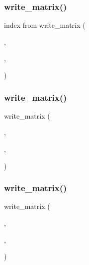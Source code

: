 \subsubsection{\texorpdfstring{write\+\_\+matrix()}{write\_matrix()}\hspace{0.1cm}{\footnotesize\ttfamily [7/15]}}
{\footnotesize\ttfamily index from write\+\_\+matrix (\begin{DoxyParamCaption}\item[{\hyperlink{a00473_ae0527cbfd56392d5095a691bbf10ba5b}{f\+ID}}]{,  }\item[{\hyperlink{a00575_a14c594ef4287da2ed00e98012e0356d9}{L\+I\+FT}}]{,  }\item[{\textquotesingle{}\hyperlink{a00575_a14c594ef4287da2ed00e98012e0356d9}{L\+I\+FT}\textquotesingle{}}]{ }\end{DoxyParamCaption})}

\mbox{\label{a00473_ae04a93a1d451776db6be5c023eea26f5}} 
\subsubsection{\texorpdfstring{write\+\_\+matrix()}{write\_matrix()}\hspace{0.1cm}{\footnotesize\ttfamily [8/15]}}
{\footnotesize\ttfamily write\+\_\+matrix (\begin{DoxyParamCaption}\item[{\hyperlink{a00473_ae0527cbfd56392d5095a691bbf10ba5b}{f\+ID}}]{,  }\item[{\hyperlink{a00473_a6d762c2c00824e501e0b1336e38cd878}{Vq}}]{,  }\item[{\textquotesingle{}\hyperlink{a00473_a6d762c2c00824e501e0b1336e38cd878}{Vq}\textquotesingle{}}]{ }\end{DoxyParamCaption})}

\mbox{\label{a00473_a533e2ddf4cca17141204e32648f7d694}} 
\subsubsection{\texorpdfstring{write\+\_\+matrix()}{write\_matrix()}\hspace{0.1cm}{\footnotesize\ttfamily [9/15]}}
{\footnotesize\ttfamily write\+\_\+matrix (\begin{DoxyParamCaption}\item[{\hyperlink{a00473_ae0527cbfd56392d5095a691bbf10ba5b}{f\+ID}}]{,  }\item[{\hyperlink{a00473_a0860e58b8f4010af9aa55717745c4b9d}{Drq}}]{,  }\item[{\textquotesingle{}\hyperlink{a00473_a0860e58b8f4010af9aa55717745c4b9d}{Drq}\textquotesingle{}}]{ }\end{DoxyParamCaption})}

